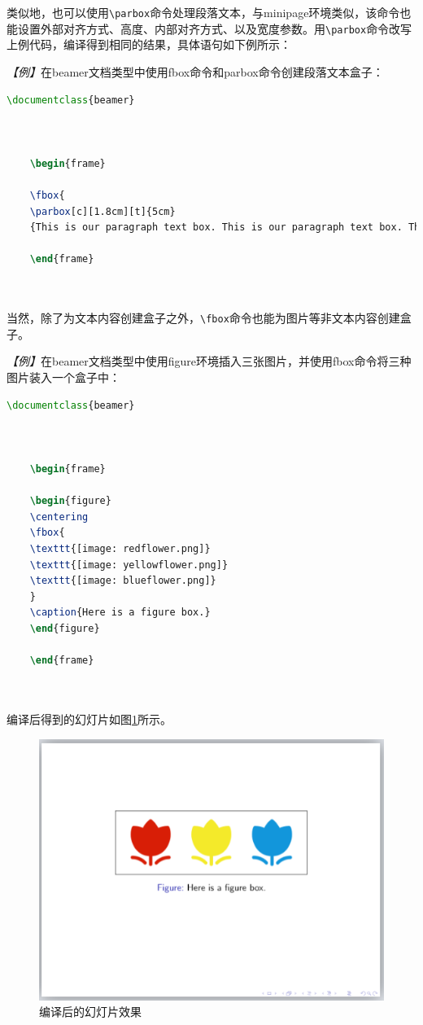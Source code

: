类似地，也可以使用\texttt{\textbackslash{}parbox}命令处理段落文本，与minipage环境类似，该命令也能设置外部对齐方式、高度、内部对齐方式、以及宽度参数。用\texttt{\textbackslash{}parbox}命令改写上例代码，编译得到相同的结果，具体语句如下例所示：

\emph{【例】}在beamer文档类型中使用fbox命令和parbox命令创建段落文本盒子：
\begin{lstlisting}[language=TeX]
    \documentclass{beamer}

    

    \begin{frame}

    \fbox{
    \parbox[c][1.8cm][t]{5cm}
    {This is our paragraph text box. This is our paragraph text box. This is our paragraph text box. This is our paragraph text box.}}

    \end{frame}

    
\end{lstlisting}

当然，除了为文本内容创建盒子之外，\texttt{\textbackslash{}fbox}命令也能为图片等非文本内容创建盒子。

\emph{【例】}在beamer文档类型中使用figure环境插入三张图片，并使用fbox命令将三种图片装入一个盒子中：
\begin{lstlisting}[language=TeX]
    \documentclass{beamer}

    

    \begin{frame}

    \begin{figure}
    \centering
    \fbox{
    \texttt{[image: redflower.png]}
    \texttt{[image: yellowflower.png]}
    \texttt{[image: blueflower.png]}
    }
    \caption{Here is a figure box.}
    \end{figure}

    \end{frame}

    
\end{lstlisting}

编译后得到的幻灯片如图\ref{fig:921}所示。

\begin{figure}[htbp]
    \centering
    \includegraphics[width = 0.6\linewidth]{images/ch_9/NEWexample08.png}
    \caption{编译后的幻灯片效果}
    \label{fig:921}
\end{figure}

